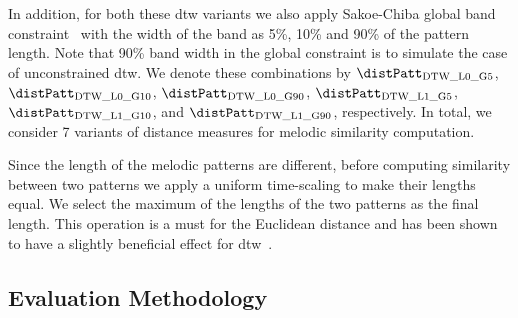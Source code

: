In addition, for both these \gls{dtw} variants we also apply Sakoe-Chiba global band constraint~\citep{Sakoe78TASLP} with the width of the band as 5\%, 10\% and 90\% of the pattern length. Note that 90\% band width in the global constraint is to simulate the case of unconstrained \gls{dtw}. We denote these combinations by $\distPatt_{\mathrm{DTW\_L0\_G5}}$, $\distPatt_{\mathrm{DTW\_L0\_G10}}$, $\distPatt_{\mathrm{DTW\_L0\_G90}}$, $\distPatt_{\mathrm{DTW\_L1\_G5}}$, $\distPatt_{\mathrm{DTW\_L1\_G10}}$, and $\distPatt_{\mathrm{DTW\_L1\_G90}}$, respectively. In total, we consider 7 variants of distance measures for melodic similarity computation.

%

Since the length of the melodic patterns are different, before computing similarity between two patterns we apply  a uniform time-scaling to make their lengths equal. We select the maximum of the lengths of the two patterns as the final length. This operation is a must for the Euclidean distance and has been shown to have a slightly beneficial effect for \gls{dtw}~\citep{Ratanamahatana2004,zhu2003query}.


\subsection{Evaluation Methodology}
\label{sec:patterns_melodic_similarity_evaluation_methodology}

